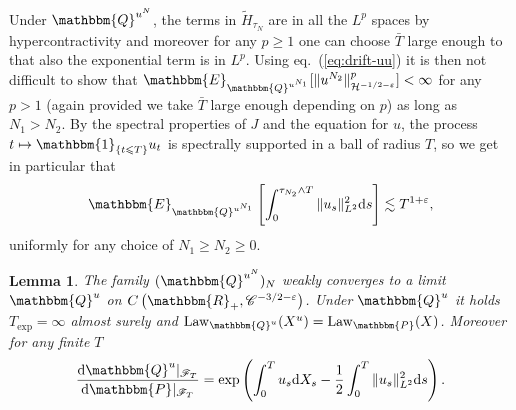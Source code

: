 \documentclass[11pt]{article}
\newcommand{\mathd}{\mathrm{d}}
\newcommand{\tmop}[1]{\ensuremath{\operatorname{#1}}}
\newtheorem{lemma}{Lemma}
\newcommand{\VV}{\mathscr{C}}
\newcommand{\CF}{\mathscr{F}}
\begin{document}
Under $\mathbbm{Q}^{u^N}$, the terms in $\tilde{H}_{\tau_N}$ are in all the
$L^p$ spaces by hypercontractivity and moreover for any $p \geqslant 1$ one
can choose $\bar{T}$ large enough to that also the exponential term is in
$L^p$. Using eq.~(\ref{eq:drift-uu}) it is then not difficult to show that
$\mathbbm{E}_{\mathbbm{Q}^{u^{N_1}}} [\| u^{N_2} \|^p_{\mathcal{H}^{- 1 / 2 -
\varepsilon}}] < \infty$ for any $p > 1$ (again provided we take $\bar{T}$
large enough depending on $p$) as long as $N_1 > N_2$. By the spectral
properties of $J$ and the equation for $u$, the process $t \mapsto
\mathbbm{1}_{\{ t \leqslant T \}} u_t$ is spectrally supported in a ball of
radius $T$, so we get in particular that
\[ \mathbbm{E}_{\mathbbm{Q}^{u^{N_1}}} \left[ \int^{\tau_{N_2} \wedge T}_0 \|
   u_s \|^2_{L^2} \mathd s \right] \lesssim T^{1 + \varepsilon}, \]
uniformly for any choice of $N_1 \geqslant N_2 \geqslant 0$.

\begin{lemma}
  \label{Lemma:changeofvariables}The family $(\mathbbm{Q}^{u^N})_N$ weakly
  converges to a limit $\mathbbm{Q}^u$ on $C \left( \mathbbm{R}_+, \VV^{- 3 /
  2 - \varepsilon} \right)$. Under $\mathbbm{Q}^u$ it holds $T_{\exp} =
  \infty$ almost surely and $\tmop{Law}_{\mathbbm{Q}^u} (X^u) =
  \tmop{Law}_{\mathbbm{P}} (X)$. Moreover for any finite $T$
  \[ \frac{\mathd \mathbbm{Q}^u |_{\CF_T}}{\mathd \mathbbm{P}|_{\CF_T}} = \exp
     \left( \int^T_0 u_s \mathd X_s - \frac{1}{2} \int^T_0 \| u_s \|^2_{L^2}
     \mathd s \right) . \]
\end{lemma}
\end{document}
